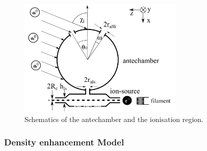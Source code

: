 		\begin{figure}[h]
			\centering
			\includegraphics[width= 0.7\textwidth]{Bilder/theoIonStorPartDens.png}
			\caption{Schematics of the antechamber and the ionisation region.}
			\label{fig:thAntIs}
		\end{figure}
		
		\subsubsection{Density enhancement Model} %
		
		
